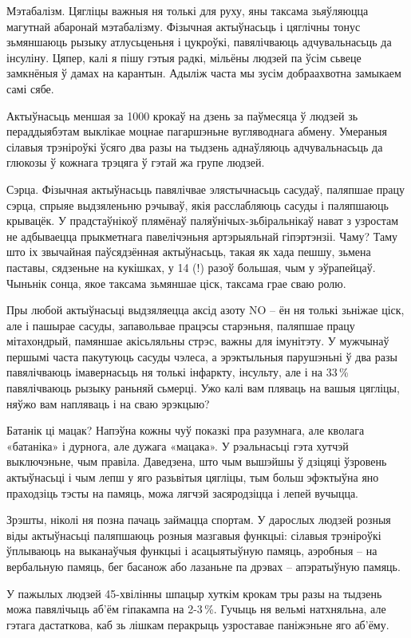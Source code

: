 Мэтабалізм. Цягліцы важныя ня толькі для руху, яны таксама зьяўляюцца магутнай абаронай мэтабалізму. Фізычная актыўнасьць і цяглічны тонус зьмяншаюць рызыку атлусьценьня і цукроўкі, павялічваюць адчувальнасьць да інсуліну. Цяпер, калі я пішу гэтыя радкі, мільёны людзей па ўсім сьвеце замкнёныя ў дамах на карантын. Адыліж часта мы зусім добраахвотна замыкаем самі сябе.

Актыўнасьць меншая за 1000 крокаў на дзень за паўмесяца ў людзей зь пераддыябэтам выклікае моцнае пагаршэньне вугляводнага абмену. Умераныя сілавыя трэніроўкі ўсяго два разы на тыдзень аднаўляюць адчувальнасьць да глюкозы ў кожнага трэцяга ў гэтай жа групе людзей.

Сэрца. Фізычная актыўнасьць павялічвае элястычнасьць сасудаў, паляпшае працу сэрца, спрыяе выдзяленьню рэчываў, якія расслабляюць сасуды і паляпшаюць крывацёк. У прадстаўнікоў плямёнаў паляўнічых-зьбіральнікаў нават з узростам не адбываецца прыкметнага павелічэньня артэрыяльнай гіпэртэнзіі. Чаму? Таму што іх звычайная паўсядзённая актыўнасьць, такая як хада пешшу, зьмена паставы, сядзеньне на кукішках, у 14 (!) разоў большая, чым у эўрапейцаў. Чыньнік сонца, якое таксама зьмяншае ціск, таксама грае сваю ролю.

Пры любой актыўнасьці выдзяляецца аксід азоту NO – ён ня толькі зьніжае ціск, але і пашырае сасуды, запавольвае працэсы старэньня, паляпшае працу мітахондрый, памяншае акісьляльны стрэс, важны для імунітэту. У мужчынаў першымі часта пакутуюць сасуды чэлеса, а эрэктыльныя парушэньні ў два разы павялічваюць імавернасьць ня толькі інфаркту, інсульту, але і на 33\,\% павялічваюць рызыку раньняй сьмерці. Ужо калі вам пляваць на вашыя цягліцы, няўжо вам напляваць і на сваю эрэкцыю?

Батанік ці мацак? Напэўна кожны чуў показкі пра разумнага, але кволага «батаніка» і дурнога, але дужага «мацака». У рэальнасьці гэта хутчэй выключэньне, чым правіла. Даведзена, што чым вышэйшы ў дзіцяці ўзровень актыўнасьці і чым лепш у яго разьвітыя цягліцы, тым больш эфэктыўна яно праходзіць тэсты на памяць, можа лягчэй засяродзіцца і лепей вучыцца.

Зрэшты, ніколі ня позна пачаць займацца спортам. У дарослых людзей розныя віды актыўнасьці паляпшаюць розныя мазгавыя функцыі: сілавыя трэніроўкі ўплываюць на выканаўчыя функцыі і асацыятыўную памяць, аэробныя – на вербальную памяць, бег басанож або лазаньне па дрэвах – апэратыўную памяць.

У пажылых людзей 45-хвілінны шпацыр хуткім крокам тры разы на тыдзень можа павялічыць аб'ём гіпакампа на 2-3\,\%. Гучыць ня вельмі натхняльна, але гэтага дастаткова, каб зь лішкам перакрыць узроставае паніжэньне яго аб'ёму.

